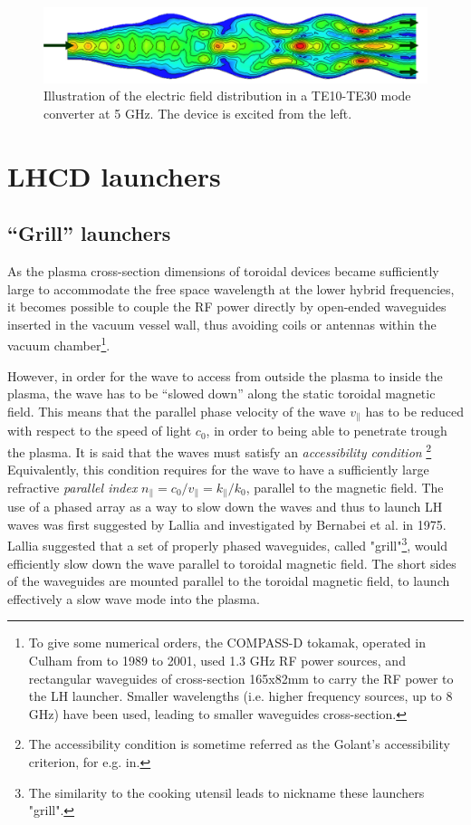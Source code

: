 \begin{figure}
\centering
\includegraphics[width=0.9\linewidth]{Figures/LHCD/ModeConverter}
\caption{Illustration of the electric field distribution in a TE10-TE30 mode converter at 5 GHz. The device is excited from the left.}
\label{fig:modeconverter}
\end{figure}


\section{LHCD launchers}
\subsection{“Grill” launchers}
As the plasma cross-section dimensions of toroidal devices became sufficiently large to accommodate the free space wavelength at the lower hybrid frequencies, it becomes possible to couple the RF power directly by open-ended waveguides inserted in the vacuum vessel wall, thus avoiding coils or antennas within the vacuum chamber\footnote{To give some numerical orders, the COMPASS-D tokamak, operated in Culham from to 1989 to 2001, used 1.3 GHz RF power sources, and rectangular waveguides of cross-section 165x82mm to carry the RF power to the LH launcher. Smaller wavelengths (i.e. higher frequency sources, up to 8 GHz) have been used, leading to smaller waveguides cross-section.}.
 
However, in order for the wave to access from outside the plasma to inside the plasma, the wave has to be “slowed down” along the static toroidal magnetic field. This means that the parallel phase velocity of the wave $v_{\parallel}$ has to be reduced with respect to the speed of light $c_0$, in order to being able to penetrate trough the plasma. It is said that the waves must satisfy an \emph{accessibility condition} \parencite{Golant1972, Stix1992}\footnote{The accessibility condition is sometime referred as the Golant's accessibility criterion, for e.g. in\parencite{Puri1974}.} Equivalently, this condition requires for the wave to have a sufficiently large refractive \emph{parallel index} $n_{\parallel} = c_0/v_{\parallel} = k_{\parallel}/k_0$, parallel to the magnetic field. The use of a phased array as a way to slow down the waves and thus to launch LH waves was first suggested by Lallia\parencite{Lallia1975} and investigated by Bernabei et al. in 1975\parencite{Bernabei1975}. Lallia suggested that a set of properly phased waveguides, called "grill"\footnote{The similarity to the cooking utensil leads to nickname these launchers "grill".}, would efficiently slow down the wave parallel to toroidal magnetic field. The short sides of the waveguides are mounted parallel to the toroidal magnetic field, to launch effectively a slow wave mode into the plasma. 

